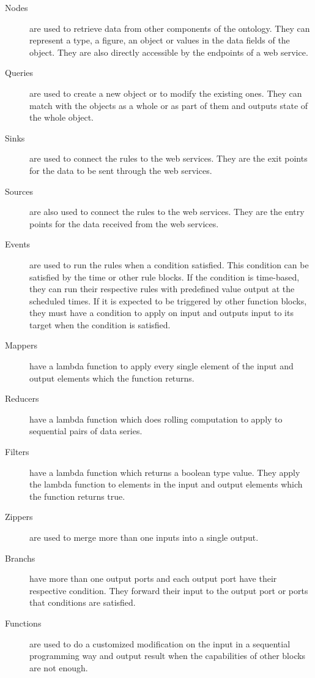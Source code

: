\begin{description}
  \item [Nodes] are used to retrieve data from other components of the ontology. They can represent a type, a figure, an object or values in the data fields of the object. They are also directly accessible by the endpoints of a web service.
  \item [Queries] are used to create a new object or to modify the existing ones. They can match with the objects as a whole or as part of them and outputs state of the whole object. 
  \item [Sinks] are used to connect the rules to the web services. They are the exit points for the data to be sent through the web services.
  \item [Sources] are also used to connect the rules to the web services. They are the entry points for the data received from the web services.
  \item [Events] are used to run the rules when a condition satisfied. This condition can be satisfied by the time or other rule blocks. If the condition is time-based, they can run their respective rules with predefined value output at the scheduled times. If it is expected to be triggered by other function blocks, they must have a condition to apply on input and outputs input to its target when the condition is satisfied.
  \item [Mappers] have a lambda function to apply every single element of the input and output elements which the function returns.
  \item [Reducers] have a lambda function which does rolling computation to apply to sequential pairs of data series.
  \item [Filters] have a lambda function which returns a boolean type value. They apply the lambda function to elements in the input and output elements which the function returns true.
  \item [Zippers] are used to merge more than one inputs into a single output.
  \item [Branchs] have more than one output ports and each output port have their respective condition. They forward their input to the output port or ports that conditions are satisfied.
  \item [Functions] are used to do a customized modification on the input in a sequential programming way and output result when the capabilities of other blocks are not enough.
\end{description}

